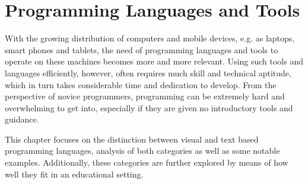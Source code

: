 \chapter{Programming Languages and Tools}
\label{chap:languages_and_tools}

With the growing distribution of computers and mobile devices, e.g. as laptops, smart phones and tablets, the need of programming languages and tools to operate on these machines becomes more and more relevant. Using such tools and languages efficiently, however, often requires much skill and technical aptitude, which in turn takes considerable time and dedication to develop. From the perspective of novice programmers, programming can be extremely hard and overwhelming to get into, especially if they are given no introductory tools and guidance.

This chapter focuses on the distinction between visual and text based programming languages, analysis of both categories as well as some notable examples. Additionally, these categories are further explored by means of how well they fit in an educational setting.   




